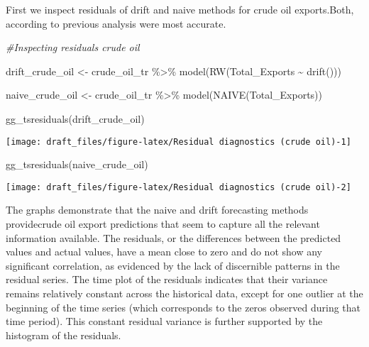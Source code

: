 \documentclass[
]{article}
\newenvironment{Shaded}{\begin{snugshade}}{\end{snugshade}}
\newcommand{\CommentTok}[1]{\textcolor[rgb]{0.56,0.35,0.01}{\textit{#1}}}
\newcommand{\FunctionTok}[1]{\textcolor[rgb]{0.00,0.00,0.00}{#1}}
\newcommand{\NormalTok}[1]{#1}
\newcommand{\OtherTok}[1]{\textcolor[rgb]{0.56,0.35,0.01}{#1}}
\newcommand{\SpecialCharTok}[1]{\textcolor[rgb]{0.00,0.00,0.00}{#1}}
\begin{document}
First we inspect residuals of drift and naive methods for crude oil
exports.Both, according to previous analysis were most accurate.

\begin{Shaded}
\begin{Highlighting}[]
\CommentTok{\#Inspecting residuals crude oil}

\NormalTok{drift\_crude\_oil }\OtherTok{\textless{}{-}}\NormalTok{ crude\_oil\_tr }\SpecialCharTok{\%\textgreater{}\%} 
  \FunctionTok{model}\NormalTok{(}\FunctionTok{RW}\NormalTok{(Total\_Exports }\SpecialCharTok{\textasciitilde{}} \FunctionTok{drift}\NormalTok{()))}

\NormalTok{naive\_crude\_oil }\OtherTok{\textless{}{-}}\NormalTok{ crude\_oil\_tr }\SpecialCharTok{\%\textgreater{}\%} 
  \FunctionTok{model}\NormalTok{(}\FunctionTok{NAIVE}\NormalTok{(Total\_Exports))}

\FunctionTok{gg\_tsresiduals}\NormalTok{(drift\_crude\_oil)}
\end{Highlighting}
\end{Shaded}

\begin{center}\texttt{[image: draft\_files/figure-latex/Residual diagnostics (crude oil)-1]} \end{center}

\begin{Shaded}
\begin{Highlighting}[]
\FunctionTok{gg\_tsresiduals}\NormalTok{(naive\_crude\_oil)}
\end{Highlighting}
\end{Shaded}

\begin{center}\texttt{[image: draft\_files/figure-latex/Residual diagnostics (crude oil)-2]} \end{center}

The graphs demonstrate that the naive and drift forecasting methods
providecrude oil export predictions that seem to capture all the
relevant information available. The residuals, or the differences
between the predicted values and actual values, have a mean close to
zero and do not show any significant correlation, as evidenced by the
lack of discernible patterns in the residual series. The time plot of
the residuals indicates that their variance remains relatively constant
across the historical data, except for one outlier at the beginning of
the time series (which corresponds to the zeros observed during that
time period). This constant residual variance is further supported by
the histogram of the residuals.
\end{document}

